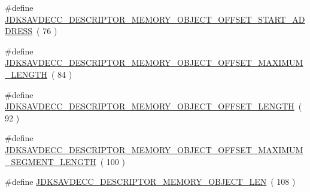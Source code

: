 \begin{DoxyCompactItemize}
\item 
\#define \hyperlink{group__descriptor__memory__object_gaf2c1303b32179b34a7d074f179c0c40e}{J\+D\+K\+S\+A\+V\+D\+E\+C\+C\+\_\+\+D\+E\+S\+C\+R\+I\+P\+T\+O\+R\+\_\+\+M\+E\+M\+O\+R\+Y\+\_\+\+O\+B\+J\+E\+C\+T\+\_\+\+O\+F\+F\+S\+E\+T\+\_\+\+S\+T\+A\+R\+T\+\_\+\+A\+D\+D\+R\+E\+SS}~( 76 )
\item 
\#define \hyperlink{group__descriptor__memory__object_ga63e6516d9c34b1773115cb87f21725c2}{J\+D\+K\+S\+A\+V\+D\+E\+C\+C\+\_\+\+D\+E\+S\+C\+R\+I\+P\+T\+O\+R\+\_\+\+M\+E\+M\+O\+R\+Y\+\_\+\+O\+B\+J\+E\+C\+T\+\_\+\+O\+F\+F\+S\+E\+T\+\_\+\+M\+A\+X\+I\+M\+U\+M\+\_\+\+L\+E\+N\+G\+TH}~( 84 )
\item 
\#define \hyperlink{group__descriptor__memory__object_gae4b7095e8259cce229ee6549f5eca995}{J\+D\+K\+S\+A\+V\+D\+E\+C\+C\+\_\+\+D\+E\+S\+C\+R\+I\+P\+T\+O\+R\+\_\+\+M\+E\+M\+O\+R\+Y\+\_\+\+O\+B\+J\+E\+C\+T\+\_\+\+O\+F\+F\+S\+E\+T\+\_\+\+L\+E\+N\+G\+TH}~( 92 )
\item 
\#define \hyperlink{group__descriptor__memory__object_ga5d7ea9f8e1d013fb8d8d2c2812aa1178}{J\+D\+K\+S\+A\+V\+D\+E\+C\+C\+\_\+\+D\+E\+S\+C\+R\+I\+P\+T\+O\+R\+\_\+\+M\+E\+M\+O\+R\+Y\+\_\+\+O\+B\+J\+E\+C\+T\+\_\+\+O\+F\+F\+S\+E\+T\+\_\+\+M\+A\+X\+I\+M\+U\+M\+\_\+\+S\+E\+G\+M\+E\+N\+T\+\_\+\+L\+E\+N\+G\+TH}~( 100 )
\item 
\#define \hyperlink{group__descriptor__memory__object_gad4027419245acec5ed6ac76adda4d015}{J\+D\+K\+S\+A\+V\+D\+E\+C\+C\+\_\+\+D\+E\+S\+C\+R\+I\+P\+T\+O\+R\+\_\+\+M\+E\+M\+O\+R\+Y\+\_\+\+O\+B\+J\+E\+C\+T\+\_\+\+L\+EN}~( 108 )
\end{DoxyCompactItemize}
